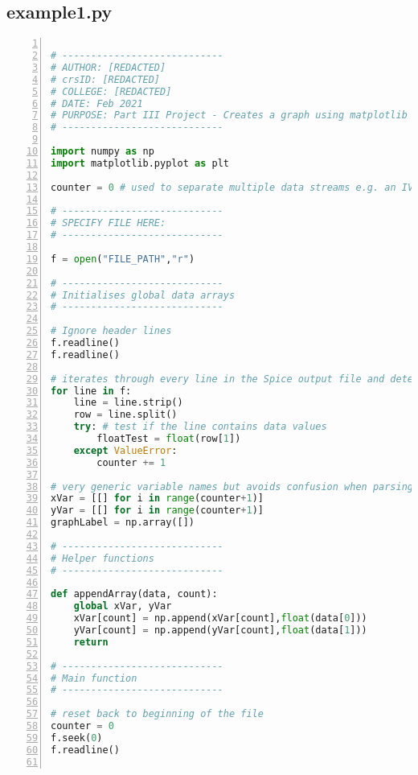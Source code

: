 \subsection{example1.py}

\begin{lstlisting}[language=Python, basicstyle=\footnotesize, numbers=left, numberstyle=\tiny, breaklines=true, commentstyle=\itshape\color{magenta}, keywordstyle=\bfseries\color{blue}, identifierstyle=\color{cyan}, stringstyle=\color{red}, showstringspaces=false]

# ----------------------------
# AUTHOR: [REDACTED]
# crsID: [REDACTED]
# COLLEGE: [REDACTED]
# DATE: Feb 2021
# PURPOSE: Part III Project - Creates a graph using matplotlib from a LTSpice output data file (see appendix B).
# ----------------------------

import numpy as np
import matplotlib.pyplot as plt

counter = 0 # used to separate multiple data streams e.g. an IV graph with different resistance values

# ----------------------------
# SPECIFY FILE HERE:
# ----------------------------

f = open("FILE_PATH","r")

# ----------------------------
# Initialises global data arrays
# ----------------------------

# Ignore header lines
f.readline()
f.readline()

# iterates through every line in the Spice output file and determines the number of data streams
for line in f:
    line = line.strip()
    row = line.split()
    try: # test if the line contains data values
        floatTest = float(row[1])
    except ValueError:
        counter += 1

# very generic variable names but avoids confusion when parsing different files with different variables e.g. resistance/capacitance data
xVar = [[] for i in range(counter+1)]
yVar = [[] for i in range(counter+1)]
graphLabel = np.array([])

# ----------------------------
# Helper functions
# ----------------------------

def appendArray(data, count):
    global xVar, yVar
    xVar[count] = np.append(xVar[count],float(data[0]))
    yVar[count] = np.append(yVar[count],float(data[1]))
    return

# ----------------------------
# Main function
# ----------------------------

# reset back to beginning of the file
counter = 0
f.seek(0)
f.readline()


\end{lstlisting}
